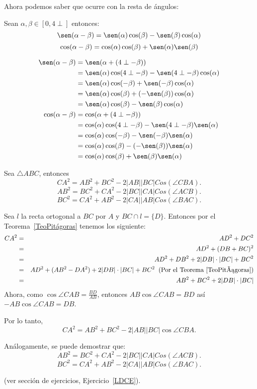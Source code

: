 Ahora podemos saber que ocurre con la resta de ángulos:
\begin{cor}Sean $\alpha,\beta \in [0,4\perp]$ entonces:
\[ \sen(\alpha - \beta) = \sen(\alpha)\cos(\beta) - \sen(\beta)\cos(\alpha) \]
\[ \cos(\alpha - \beta) = \cos(\alpha)\cos(\beta) + \sen(\alpha)\sen(\beta) \]
\end{cor}
\begin{pba}
\begin{align*}
\sen(\alpha - \beta) 
&= \sen(\alpha + (4\perp - \beta))\\
&= \sen(\alpha)\cos(4\perp - \beta) - \sen(4\perp - \beta)\cos(\alpha)\\
&= \sen(\alpha)\cos(-\beta) + \sen( - \beta)\cos(\alpha)\\
&= \sen(\alpha)\cos(\beta) +(- \sen( \beta))\cos(\alpha)\\
&= \sen(\alpha)\cos(\beta) - \sen( \beta)\cos(\alpha)\\
\cos(\alpha - \beta) 
&= \cos(\alpha + (4\perp - \beta))\\
&= \cos(\alpha)\cos(4\perp - \beta) - \sen(4\perp - \beta)\sen(\alpha)\\
&= \cos(\alpha)\cos(-\beta) - \sen( - \beta)\sen(\alpha)\\
&= \cos(\alpha)\cos(\beta) -(- \sen( \beta))\sen(\alpha)\\
&= \cos(\alpha)\cos(\beta) + \sen( \beta)\sen(\alpha)\\                    
\end{align*} 
\end{pba}

\begin{teo}\label{LDC}
Sea $\triangle ABC$, entonces
$$CA^{2}=AB^{2}+BC^{2}-2|AB||BC|Cos(\angle CBA).$$
$$AB^{2}=BC^{2}+CA^{2}-2|BC||CA|Cos(\angle ACB).$$
$$BC^{2}=CA^{2}+AB^{2}-2|CA||AB|Cos(\angle BAC).$$
\end{teo}
\begin{dem}
Sea $l$ la recta ortogonal a $BC$ por $A$ y $BC\cap l=\{D\}.$ Entonces por el Teorema~\ref{TeoPitágoras} tenemos los siguiente: 
\begin{eqnarray*}
CA^{2}&=&AD^{2}+DC^{2}\\
&=& AD^{2}+(DB+BC)^{2}\\
&=& AD^{2}+DB^{2}+2|DB|\cdot |BC|+BC^{2}\\
&=& AD^{2}+(AB^{2}-DA^{2})+2|DB|\cdot |BC|+BC^{2}\;\;\text{(Por el Teorema~\ref{TeoPitágoras})}\\ 
&=& AB^{2}+BC^{2}+2|DB|\cdot |BC| 
 \end{eqnarray*}
Ahora, como $\cos \angle  CAB=\frac{BD}{AB}$, entonces $AB\cos \angle CAB=BD$ así $-AB\cos \angle CAB=DB$.

Por lo tanto,
$$ CA^{2}=AB^{2}+BC^{2}-2|AB||BC|\cos\angle CBA.$$

Análogamente, se puede demostrar que:
$$AB^{2}=BC^{2}+CA^{2}-2|BC||CA|Cos(\angle ACB).$$
$$BC^{2}=CA^{2}+AB^{2}-2|CA||AB|Cos(\angle BAC).$$

(ver sección de ejercicios, Ejercicio~\ref{LDCE}). 
\end{dem}

